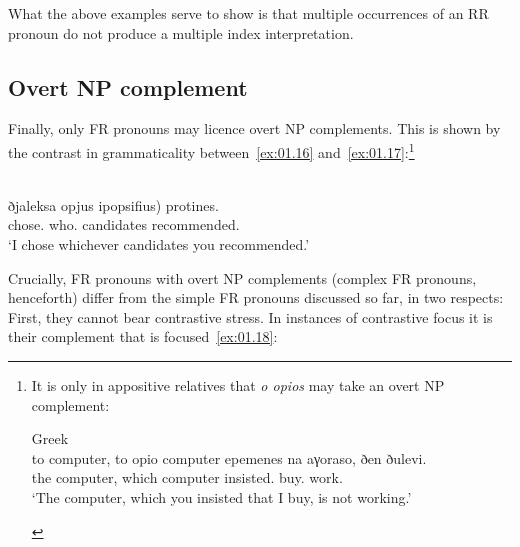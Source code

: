 \documentclass[output=paper]{langsci/langscibook}
\begin{document}
What the above examples serve to show is that multiple occurrences of an
\gls{RR} pronoun do not produce a multiple index interpretation.

\subsection{Overt NP complement}
Finally, only \gls{FR} pronouns may
licence overt NP complements. This is shown by the contrast in grammaticality
between~\eqref{ex:01.16} and~\eqref{ex:01.17}:\footnote{It is only in
    appositive relatives that \emph{o opios} may take an overt NP complement:

\begin{exe}
     Greek\\
	\gll to computer, {to opio} computer epemenes na aγoraso, ðen ðulevi.\\
		the computer, which computer insisted.\Ssg{} \Sbjv{} buy.\Fsg{} \Neg{} work.\Tsg{}\\
	\glt \enquote*{The computer, which you insisted that I buy, is not working.}
\end{exe}}

\ea {}\label{ex:01.16}\\
    \gll ðjaleksa opjus \llap{(}ipopsifius) protines.\\
		chose.\Fsg{} who.\Acc{} candidates recommended.\Ssg{}\\
	\glt \enquote*{I chose whichever candidates you recommended.}
\ex {}\label{ex:01.17}
	\z
\z

Crucially, \gls{FR} pronouns with overt NP complements (complex \gls{FR}
pronouns, henceforth) differ from the simple \gls{FR} pronouns discussed so
far, in two respects: First, they cannot bear contrastive stress. In instances
of contrastive focus it is their complement that is
focused~\eqref{ex:01.18}:\largerpage[-1]
\end{document}
